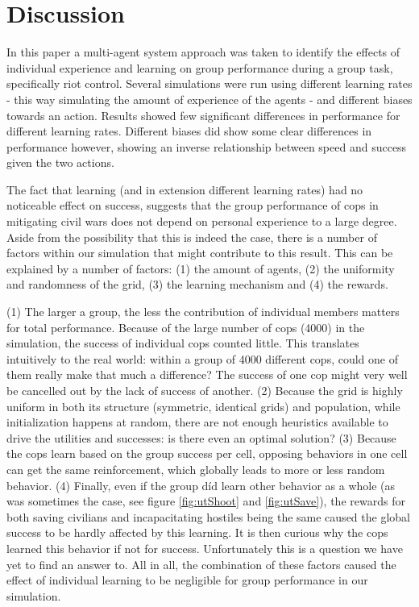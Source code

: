 \section{Discussion}
In this paper a multi-agent system approach was taken to identify the effects of individual experience and learning on group performance during a group task, specifically riot control. Several simulations were run using different learning rates - this way simulating the amount of experience of the agents - and different biases towards an action. Results showed few significant differences in performance for different learning rates. Different biases did show some clear differences in performance however, showing an inverse relationship between speed and success given the two actions.

The fact that learning (and in extension different learning rates) had no noticeable effect on success, suggests that the group performance of cops in mitigating civil wars does not depend on personal experience to a large degree. Aside from the possibility that this is indeed the case, there is a number of factors within our simulation that might contribute to this result.
This can be explained by a number of factors: (1) the amount of agents, (2) the uniformity and randomness of the grid, (3) the learning mechanism and (4) the rewards. 

(1) The larger a group, the less the contribution of individual members matters for total performance. Because of the large number of cops (4000) in the simulation, the success of individual cops counted little. This translates intuitively to the real world: within a group of 4000 different cops, could one of them really make that much a difference? The success of one cop might very well be cancelled out by the lack of success of another.
(2) Because the grid is highly uniform in both its structure (symmetric, identical grids) and population, while initialization happens at random, there are not enough heuristics available to drive the utilities and successes: is there even an optimal solution? (3) Because the cops learn based on the group success per cell, opposing behaviors in one cell can get the same reinforcement, which globally leads to more or less random behavior. (4) Finally, even if the group d\'{i}d learn other behavior as a whole (as was sometimes the case, see figure \ref{fig:utShoot} and \ref{fig:utSave}), the rewards for both saving civilians and incapacitating hostiles being the same caused the global success to be hardly affected by this learning. It is then curious why the cops learned this behavior if not for success. Unfortunately this is a question we have yet to find an answer to.
All in all, the combination of these factors caused the effect of individual learning to be negligible for group performance in our simulation.

